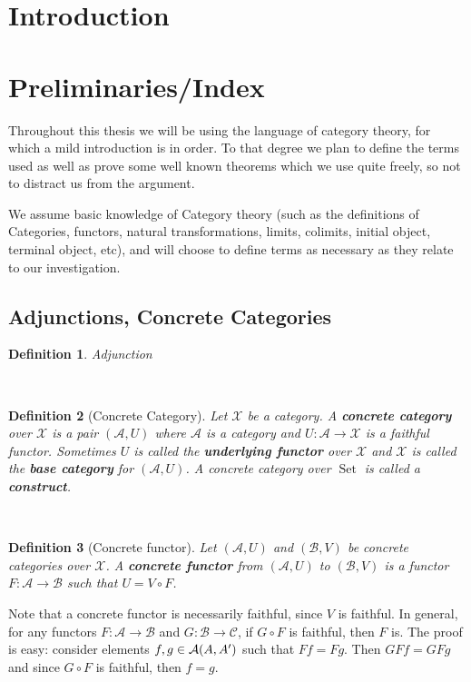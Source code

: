 \documentclass[12pt,a4paper]{article}
\newtheorem{definition}{Definition}[section] %
\DeclareMathOperator{\Set}{Set}
\def\HomA{\ensuremath\mathcal{A}}
\begin{document}
\pagestyle{fancy}
\fancyhf{}
\rfoot{\thepage}
\section{Introduction}
\section{Preliminaries/Index}

Throughout this thesis we will be using the language of category theory, for which a mild introduction is in order. To that degree we plan to define the terms used as well as prove some well known theorems which we use quite freely, so not to distract us from the argument.

We assume basic knowledge of Category theory (such as the definitions of Categories, functors, natural transformations, limits, colimits, initial object, terminal object, etc), and will choose to define terms as necessary as they relate to our investigation.
\\
\subsection{Adjunctions, Concrete Categories}
\begin{definition}
	Adjunction
\end{definition}
\
\begin{definition}[Concrete Category]
	Let $\mathcal{X}$ be a category. A \textbf{concrete category} over $\mathcal{X}$ is a pair $(\mathcal{A}, U)$ where $\mathcal{A}$ is a category and $U: \mathcal{A} \to \mathcal{X}$ is a faithful functor. Sometimes $U$ is called the \textbf{underlying functor} over $\mathcal{X}$ and $\mathcal{X}$ is called the \textbf{base category} for $(\mathcal{A},U)$. A concrete category over $\Set$ is called a \textbf{construct}.
\end{definition}
\
\begin{definition} [Concrete functor]
Let $(\mathcal{A}, U)$ and $(\mathcal{B}, V)$ be concrete categories over $\mathcal{X}$. A \textbf{concrete functor} from $(\mathcal{A}, U)$ to $(\mathcal{B},V)$ is a functor $F: \mathcal{A} \to \mathcal{B}$ such that $U = V \circ F$. 
\end{definition}
Note that a concrete functor is necessarily faithful, since $V$ is faithful. In general, for any functors $F: \mathcal{A} \to \mathcal{B}$ and $G: \mathcal{B} \to \mathcal{C}$, if $G \circ F$ is faithful, then $F$ is. The proof is easy: consider elements  $f, g \in \HomA(A, A')$ such that $Ff = Fg$. Then $GFf = GFg$ and since $G\circ F$ is faithful, then $f = g$. 
\end{document}
